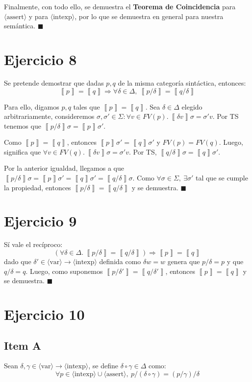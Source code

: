 \documentclass{article}
\newcommand{\aexp}[1]{\langle\text{#1}\rangle}
\newcommand{\intexp}{\aexp{intexp}}
\newcommand{\var}{\aexp{var}}
\newcommand{\assert}{\aexp{assert}}
\newcommand{\sem}[1]{\left\llbracket #1\right\rrbracket}
\begin{document}
Finalmente, con todo ello, se demuestra el \textbf{Teorema de Coincidencia} para $\assert$ y para $\intexp$, por lo que se demuestra en general para nuestra semántica. $\blacksquare$

\section*{Ejercicio 8}
Se pretende demostrar que dadas $p, q$ de la misma categoría sintáctica, entonces:
\begin{equation*}
	\sem{p} = \sem{q} \Rightarrow \forall \delta \in \Delta,\ \sem{p/\delta} = \sem{q/\delta}
\end{equation*}

Para ello, digamos $p, q$ tales que $\sem{p} = \sem{q}$.
Sea $\delta \in \Delta$ elegido arbitrariamente, consideremos $\sigma, \sigma' \in \Sigma : \forall v \in FV(p).\ \sem{\delta v} \sigma = \sigma' v.$
Por TS tenemos que $\sem{p/\delta} \sigma = \sem{p} \sigma'$.

Como $\sem{p} = \sem{q}$, entonces $\sem{p} \sigma' = \sem{q} \sigma'$ y $FV(p) = FV(q)$.
Luego, significa que $\forall v \in FV(q).\ \sem{\delta v} \sigma = \sigma' v$.
Por TS, $\sem{q/\delta} \sigma = \sem{q} \sigma'$.

Por la anterior igualdad, llegamos a que $\sem{p/\delta} \sigma = \sem{p} \sigma' = \sem{q} \sigma' = \sem{q/\delta} \sigma$.
Como $\forall \sigma \in \Sigma,\ \exists \sigma'$ tal que se cumple la propiedad, entonces $\sem{p/\delta} = \sem{q/\delta}$ y se demuestra. $\blacksquare$

\section*{Ejercicio 9}
Sí vale el recíproco:
\begin{equation*}
	(\forall \delta \in \Delta.\ \sem{p/\delta} = \sem{q/\delta}) \Rightarrow \sem{p} = \sem{q}
\end{equation*}
dado que $\delta' \in \var \to \intexp$ definida como $\delta w = w$ genera que $p/\delta = p$ y que $q/\delta = q$.
Luego, como suponemos $\sem{p/\delta'} = \sem{q/\delta'}$, entonces $\sem{p} = \sem{q}$ y se demuestra. $\blacksquare$

\section*{Ejercicio 10}

\subsection*{Item A}
Sean $\delta, \gamma \in \var \to \intexp$, se define $\delta \circ \gamma \in \Delta$ como:
\begin{equation*}
	\forall p \in \intexp \cup \assert,\ p/(\delta \circ \gamma) = (p/\gamma)/\delta
\end{equation*}
\end{document}
